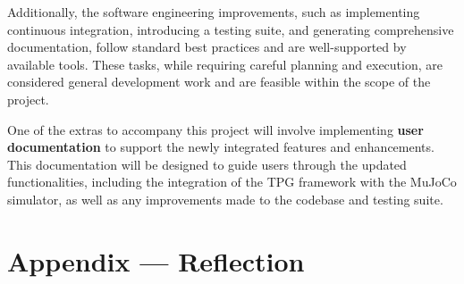 \documentclass{article}
\begin{document}
Additionally, the software engineering improvements, such as implementing continuous integration, introducing a testing suite, and generating comprehensive documentation, follow standard best practices and are well-supported by available tools. These tasks, while requiring careful planning and execution, are considered general development work and are feasible within the scope of the project.

One of the extras to accompany this project will involve implementing \textbf{user documentation} to support the newly integrated features and enhancements. This documentation will be designed to guide users through the updated functionalities, including the integration of the TPG framework with the MuJoCo simulator, as well as any improvements made to the codebase and testing suite.

\newpage{}

\section*{Appendix --- Reflection}


\end{document}
